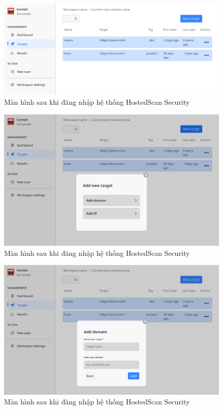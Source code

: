 \begin{figure}[H]
    \centering
    \includegraphics[width=\textwidth]{images/prototype/prototype_22112022/dashboard_target.png}
    \caption{Màn hình sau khi đăng nhập hệ thống HostedScan Security}
\end{figure}

\begin{figure}[H]
    \centering
\includegraphics[width=\textwidth]{images/prototype/prototype_22112022/dashboard_target_add target.png}
    \caption{Màn hình sau khi đăng nhập hệ thống HostedScan Security}
\end{figure}

\begin{figure}[H]
    \centering
    \includegraphics[width=\textwidth]{images/prototype/prototype_22112022/dashboard_target_add target_add domain.png}
    \caption{Màn hình sau khi đăng nhập hệ thống HostedScan Security}
\end{figure}

